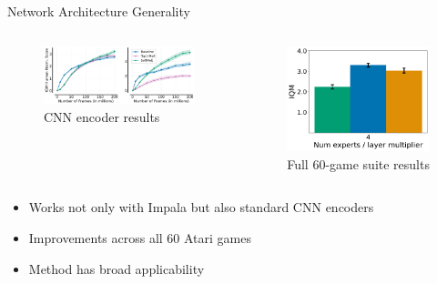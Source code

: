 \documentclass{beamer}
\begin{document}
\begin{frame}{Network Architecture Generality}
  \begin{columns}[T]
    \begin{column}{0.5\textwidth}
      \begin{figure}
        \centering
        \includegraphics[width=\textwidth]{Mixtures_of_Experts_Unlock Parameter_Scaling_for_Deep_RL/figures/combinedCNN.pdf}
        \caption{CNN encoder results}
      \end{figure}
    \end{column}
    \begin{column}{0.5\textwidth}
      \begin{figure}
        \centering
        \includegraphics[width=\textwidth]{Don_t_flatten_tokenize/figures/results/60games_aggregate_comparison_just_iqm_bar.pdf}
        \caption{Full 60-game suite results}
      \end{figure}
    \end{column}
  \end{columns}
  
  \begin{itemize}
    \item Works not only with Impala but also standard CNN encoders
    \item Improvements across all 60 Atari games
    \item Method has broad applicability
  \end{itemize}
\end{frame}
\end{document}
